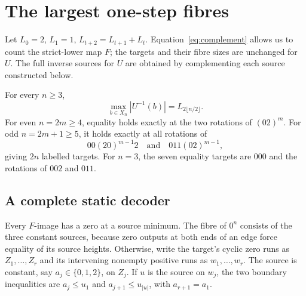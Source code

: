 \section{The largest one-step fibres}

Let $L_0=2$, $L_1=1$, $L_{t+2}=L_{t+1}+L_t$. Equation~\eqref{eq:complement}
allows us to count the strict-lower map $F$; the targets and their fibre
sizes are unchanged for $U$. The full inverse sources for $U$ are obtained
by complementing each source constructed below.

\begin{theorem}\label{thm:max}
 For every $n\ge3$,
 \[
 \max_{b\in X_n}|U^{-1}(b)|=L_{2\lfloor n/2\rfloor}.
 \]
 For even $n=2m\ge4$, equality holds exactly at the two rotations of
 $(02)^m$. For odd $n=2m+1\ge5$, it holds exactly at all rotations of
 \[
 00(20)^{m-1}2\quad\text{and}\quad011(02)^{m-1},
 \]
 giving $2n$ labelled targets. For $n=3$, the seven equality targets
 are $000$ and the rotations of $002$ and $011$.
\end{theorem}

\subsection{A complete static decoder}
Every $F$-image has a zero at a source minimum. The fibre of $0^n$
consists of the three constant sources, because zero outputs at both
ends of an edge force equality of its source heights. Otherwise, write
the target's cyclic zero runs as $Z_1,\ldots,Z_r$ and its intervening
nonempty positive runs as $w_1,\ldots,w_r$. The source is constant,
say $a_j\in\{0,1,2\}$, on $Z_j$. If $u$ is the source on $w_j$,
the two boundary inequalities are $a_j\le u_1$ and
$a_{j+1}\le u_{|u|}$, with $a_{r+1}=a_1$.

